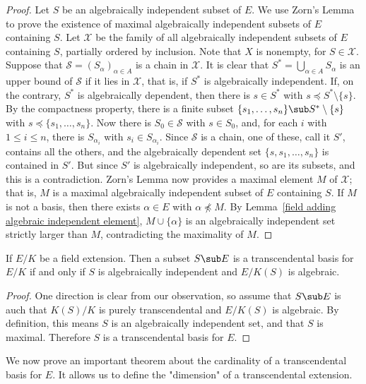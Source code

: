 \begin{proof}
Let $S$ be an algebraically independent subset of $E$. We use Zorn's Lemma to prove the existence of maximal algebraically independent subsets of $E$ containing $S$. Let $\mathcal{X}$ be the family of all algebraically independent subsets of $E$ containing $S$, partially ordered by inclusion. Note that $X$ is nonempty, for $S\in\mathcal{X}$. Suppose that $\mathcal{S}=(S_\alpha)_{\alpha\in A}$ is a chain in $\mathcal{X}$. It is clear that $S^*=\bigcup_{\alpha\in A}S_\alpha$ is an upper bound of $\mathcal{S}$ if it lies in $\mathcal{X}$, that is, if $S^*$ is algebraically independent. If, on the contrary, $S^*$ is algebraically dependent, then there is $s\in S^*$ with $s\preceq S^*\setminus\{s\}$. By the compactness property, there is a finite subset $\{s_1,\dots,s_n\}\sub S^*\setminus\{s\}$ with $s\preceq\{s_1,\dots,s_n\}$. Now there is $S_0\in\mathcal{S}$ with $s\in S_0$, and, for each $i$ with $1\leq i\leq n$, there is $S_{\alpha_i}$ with $s_i\in S_{\alpha_i}$. Since $\mathcal{S}$ is a chain, one of these, call it $S'$, contains all the others, and the algebraically dependent set $\{s,s_1,\dots,s_n\}$ is contained in $S'$. But since $S'$ is algebraically independent, so are its subsets, and this is a contradiction. Zorn's Lemma now provides a maximal element $M$ of $\mathcal{X}$; that is, $M$ is a maximal algebraically independent subset of $E$ containing $S$. If $M$ is not a basis, then there exists $\alpha\in E$ with $\alpha\not\preceq M$. By Lemma~\ref{field adding algebraic independent element}, $M\cup\{\alpha\}$ is an algebraically independent set strictly larger than $M$, contradicting the maximality of $M$.
\end{proof}
\begin{theorem}\label{field ext transcendental basis iff}
If $E/K$ be a field extension. Then a subset $S\sub E$ is a transcendental basis for $E/K$ if and only if $S$ is algebraically independent and $E/K(S)$ is algebraic.
\end{theorem}
\begin{proof}
One direction is clear from our observation, so assume that $S\sub E$ is auch that $K(S)/K$ is purely transcendental and $E/K(S)$ is algebraic. By definition, this means $S$ is an algebraically independent set, and that $S$ is maximal. Therefore $S$ is a transcendental basis for $E$.
\end{proof}
We now prove an important theorem about the cardinality of a transcendental basis for $E$. It allows us to define the "dimension" of a transcendental extension.
